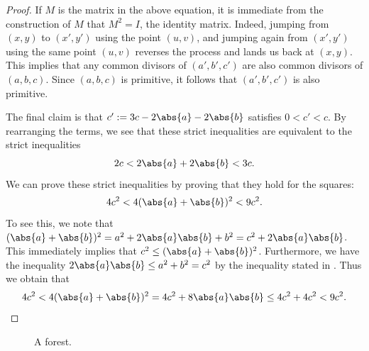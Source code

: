 \begin{proof}
  If $M$ is the matrix in the above equation, it is immediate from the construction of $M$ that $M^2=I$, the identity matrix. Indeed, jumping from $(x,y)$ to $(x',y')$ using the point $(u,v)$, and jumping again from $(x',y')$ using the same point $(u,v)$ reverses the process and lands us back at $(x,y)$. This implies that any common divisors of $(a',b',c')$ are also common divisors of $(a,b,c)$. Since $(a,b,c)$ is primitive, it follows that $(a',b',c')$ is also primitive.
  
  The final claim is that $c':= 3c-2\abs{a}-2\abs{b}$ satisfies $0<c'<c$. By rearranging the terms, we see that these strict inequalities are equivalent to the strict inequalities
  \begin{equation*}
    2c<2\abs{a}+2\abs{b}<3c.
  \end{equation*}
  We can prove these strict inequalities by proving that they hold for the squares:
  \begin{equation*}
    4c^2<4(\abs{a}+\abs{b})^2<9c^2.
  \end{equation*}
  To see this, we note that $(\abs{a}+\abs{b})^2=a^2+2\abs{a}\abs{b} + b^2= c^2+2\abs{a}\abs{b}$. This immediately implies that $c^2\leq (\abs{a}+\abs{b})^2$. Furthermore, we have the inequality $2\abs{a}\abs{b}\leq a^2+b^2=c^2$ by the inequality stated in . Thus we obtain that
  \begin{equation*}
    4c^2< 4(\abs{a}+\abs{b})^2 = 4c^2+8\abs{a}\abs{b} \leq 4c^2 + 4c^2<9c^2.\qedhere
  \end{equation*}
\end{proof}

\begin{figure}[tbp]
  \centering
  \begingroup

  
  \newcommand{\DrawRootedTree}[2][]{%
    \begin{scope}[tree,#1]%
      \node {} #2;%
    \end{scope}%
  }


  \endgroup
  \caption[A forest]{A forest.}
  \label{figure:forest}
\end{figure}

